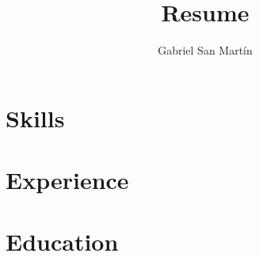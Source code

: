 \documentclass[12pt, letterpaper]{article}
\begin{document}
\title{Resume}
\author{Gabriel San Mart\'in}

\maketitle

\section{Skills}
\section{Experience}
\section{Education}
\end{document}
